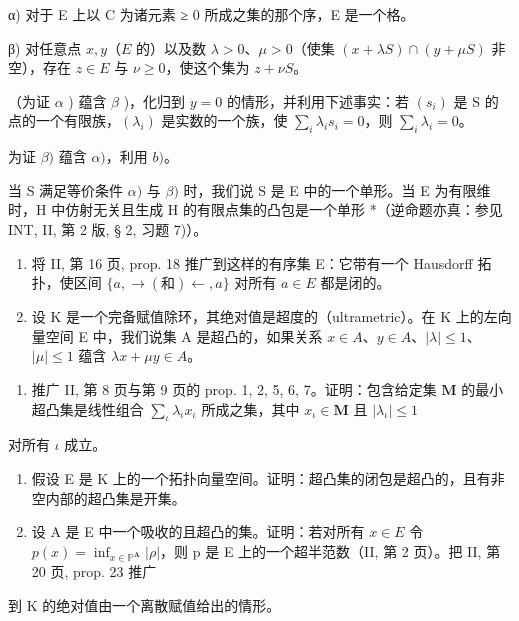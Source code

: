 α) 对于 E 上以 C 为诸元素 ≥ 0 所成之集的那个序，E 是一个格。

β) 对任意点 \(x, y\)（\(E\) 的）以及数 \(\lambda > 0\)、\(\mu > 0\)（使集 \((x + \lambda S) \cap (y + \mu S)\) 非空），存在 \(z \in E\) 与 \(\nu \geqslant 0\)，使这个集为 \(z + \nu S\)。

（为证 \(\alpha\) ) 蕴含 \(\beta\) )，化归到 \(y = 0\) 的情形，并利用下述事实：若 \((s_i)\) 是 S 的点的一个有限族，\((\lambda_i)\) 是实数的一个族，使 \(\sum_{i} \lambda_i s_i = 0\)，则 \(\sum_{i} \lambda_i = 0\)。

为证 \(\beta)\) 蕴含 \(\alpha)\)，利用 \(b)\)。

当 S 满足等价条件 \(\alpha)\) 与 \(\beta)\) 时，我们说 S 是 E 中的一个单形。当 E 为有限维时，H 中仿射无关且生成 H 的有限点集的凸包是一个单形 *（逆命题亦真：参见 INT, II, 第 2 版, § 2, 习题 7)）。

\begin{enumerate}
\def\labelenumi{\arabic{enumi})}
\setcounter{enumi}{41}
\item
  将 II, 第 16 页, prop. 18 推广到这样的有序集 E：它带有一个 Hausdorff 拓扑，使区间 \(\{a, \to (\text{和}) \gets, a\}\) 对所有 \(a \in E\) 都是闭的。
\item
  设 K 是一个完备赋值除环，其绝对值是超度的（ultrametric）。在 K 上的左向量空间 E 中，我们说集 A 是超凸的，如果关系 \(x \in A\)、\(y \in A\)、\(|\lambda| \leqslant 1\)、\(|\mu| \leqslant 1\) 蕴含 \(\lambda x + \mu y \in A\)。
\end{enumerate}

\begin{enumerate}
\def\labelenumi{\alph{enumi})}
\tightlist
\item
  推广 II, 第 8 页与第 9 页的 prop. 1, 2, 5, 6, 7。证明：包含给定集 \(\mathbf{M}\) 的最小超凸集是线性组合 \(\sum_{\iota} \lambda_{\iota} x_{\iota}\) 所成之集，其中 \(x_{\iota} \in \mathbf{M}\) 且 \(|\lambda_{\iota}| \leqslant 1\)
\end{enumerate}

对所有 \(\iota\) 成立。

\begin{enumerate}
\def\labelenumi{\alph{enumi})}
\setcounter{enumi}{1}
\item
  假设 E 是 K 上的一个拓扑向量空间。证明：超凸集的闭包是超凸的，且有非空内部的超凸集是开集。
\item
  设 A 是 E 中一个吸收的且超凸的集。证明：若对所有 \(x \in E\) 令 \(p(x) = \inf_{x \in \mathbb{P}^{\mathbf{A}}} |\rho|\)，则 p 是 E 上的一个超半范数（II, 第 2 页）。把 II, 第 20 页, prop. 23 推广
\end{enumerate}

到 K 的绝对值由一个离散赋值给出的情形。

